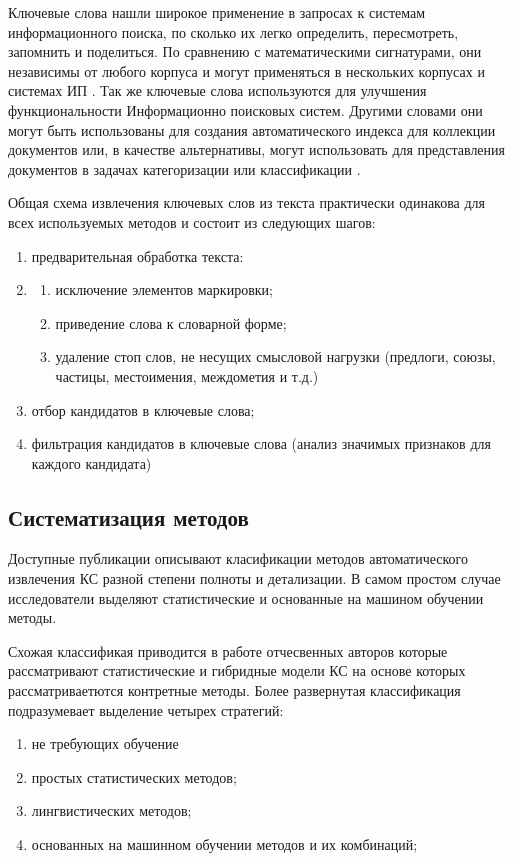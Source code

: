 Ключевые слова нашли широкое применение в запросах к системам информационного поиска, по сколько их легко определить, пересмотреть, запомнить и поделиться.
По сравнению с математическими сигнатурами, они независимы от любого корпуса и могут применяться в нескольких корпусах и системах ИП \cite{5}.
Так же ключевые слова используются для улучшения функциональности Информационно поисковых систем.
Другими словами они могут быть использованы для создания автоматического индекса для коллекции документов или, в качестве альтернативы, могут использовать для представления документов в задачах категоризации или классификации \cite{1}.

Общая схема извлечения ключевых слов из текста практически одинакова для всех используемых методов и состоит из следующих шагов:
\begin{enumerate}
	\item предварительная обработка текста:
	\item \begin{enumerate}
		\item исключение элементов маркировки;
		\item приведение слова к словарной форме;
		\item удаление стоп слов, не несущих смысловой нагрузки (предлоги, союзы, частицы, местоимения, междометия и т.д.)
	\end{enumerate}
	\item отбор кандидатов в ключевые слова;
	\item фильтрация кандидатов в ключевые слова (анализ значимых признаков для каждого кандидата)
\end{enumerate}

\subsection{Систематизация методов}
Доступные публикации описывают класификации методов автоматического извлечения КС разной степени полноты и детализации. В самом простом случае исследователи выделяют статистические и основанные на машином обучении методы.

Схожая классификая приводится в работе отчесвенных авторов которые рассматривают статистические и гибридные модели КС на основе которых рассматриваетются контретные методы. 
Более развернутая классификация подразумевает выделение четырех стратегий:
\begin{enumerate}
	\item не требующих обучение 
	\item простых статистических методов;
	\item лингвистических методов;
	\item основанных на машинном обучении методов и их комбинаций;
\end{enumerate}

